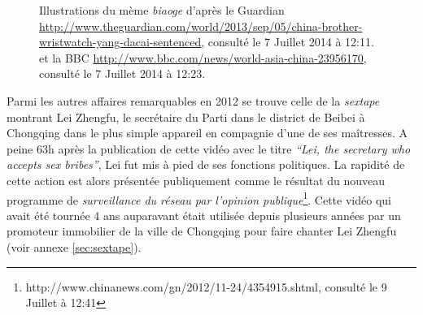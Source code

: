 \begin{figure}[htbp]
    \hspace{\fill}%
    \hspace{\fill}%
    \hspace{\fill}%
    \caption{ 
      Illustrations du mème \textit{biaoge} d'après le Guardian \url{http://www.theguardian.com/world/2013/sep/05/china-brother-wristwatch-yang-dacai-sentenced}, consulté le 7 Juillet 2014 à 12:11. et la BBC \url{http://www.bbc.com/news/world-asia-china-23956170}, consulté le 7 Juillet 2014 à 12:23.
    }
\end{figure}

Parmi les autres affaires remarquables en 2012 se trouve celle de la \textit{sextape} montrant Lei Zhengfu, le secrétaire du Parti dans le district de Beibei à Chongqing dans le plus simple appareil en compagnie d'une de ses maîtresses. A peine 63h après la publication de cette vidéo avec le titre \textit{``Lei, the secretary who accepts sex bribes''}, Lei fut mis à pied de ses fonctions politiques. La rapidité de cette action est alors présentée publiquement comme le résultat du nouveau programme de \textit{surveillance du réseau par l'opinion publique}\footnote{http://www.chinanews.com/gn/2012/11-24/4354915.shtml, consulté le 9 Juillet à 12:41}. Cette vidéo qui avait été tournée 4 ans auparavant était utilisée depuis plusieurs années par un promoteur immobilier de la ville de Chongqing pour faire chanter Lei Zhengfu (voir annexe \ref{sec:sextape}). 

